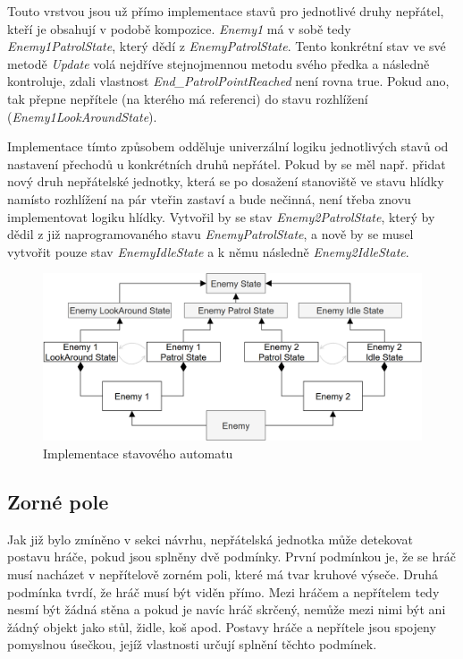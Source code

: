 \documentclass[FM,Proj]{tulthesis}
\begin{document}
	Touto vrstvou jsou už přímo implementace stavů pro jednotlivé druhy nepřátel, kteří je obsahují v podobě kompozice. \textit{Enemy1} má v sobě tedy \textit{Enemy1PatrolState}, který dědí z \textit{EnemyPatrolState}. Tento konkrétní stav ve své metodě \textit{Update} volá nejdříve stejnojmennou metodu svého předka a následně kontroluje, zdali vlastnost \textit{End\_PatrolPointReached} není rovna true. Pokud ano, tak přepne nepřítele (na kterého má referenci) do stavu rozhlížení (\textit{Enemy1LookAroundState}).
	
	Implementace tímto způsobem odděluje univerzální logiku jednotlivých stavů od nastavení přechodů u konkrétních druhů nepřátel. Pokud by se měl např. přidat nový druh nepřátelské jednotky, která se po dosažení stanoviště ve stavu hlídky namísto rozhlížení na pár vteřin zastaví a bude nečinná, není třeba znovu implementovat logiku hlídky. Vytvořil by se stav \textit{Enemy2PatrolState}, který by dědil z již naprogramovaného stavu \textit{EnemyPatrolState}, a nově by se musel vytvořit pouze stav \textit{EnemyIdleState} a k němu následně \textit{Enemy2IdleState}.
		 
	\begin{figure}[ht]
		\centering
		\includegraphics[width=\textwidth]{img/FSM_Specific}
		\caption{Implementace stavového automatu}		
	\end{figure}
		 
	\subsection{Zorné pole}
	
	Jak již bylo zmíněno v sekci návrhu, nepřátelská jednotka může detekovat postavu hráče, pokud jsou splněny dvě podmínky. První podmínkou je, že se hráč musí nacházet v nepřítelově zorném poli, které má tvar kruhové výseče. Druhá podmínka tvrdí, že hráč musí být viděn přímo. Mezi hráčem a nepřítelem tedy nesmí být žádná stěna a pokud je navíc hráč skrčený, nemůže mezi nimi být ani žádný objekt jako stůl, židle, koš apod. Postavy hráče a nepřítele jsou spojeny pomyslnou úsečkou, jejíž vlastnosti určují splnění těchto podmínek.
	
\end{document}
